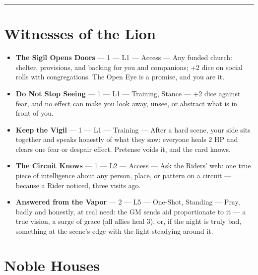 \medskip\hrule\medskip

\section{Witnesses of the Lion}

\begin{itemize}
    \item \textbf{The Sigil Opens Doors} --- 1 --- L1 --- Access --- Any funded church: shelter, provisions, and backing for you and companions; +2 dice on social rolls with congregations. The Open Eye is a promise, and you are it.
    \item \textbf{Do Not Stop Seeing} --- 1 --- L1 --- Training, Stance --- +2 dice against fear, and no effect can make you look away, unsee, or abstract what is in front of you.
    \item \textbf{Keep the Vigil} --- 1 --- L1 --- Training --- After a hard scene, your side sits together and speaks honestly of what they saw: everyone heals 2 HP and clears one fear or despair effect. Pretense voids it, and the card knows.
    \item \textbf{The Circuit Knows} --- 1 --- L2 --- Access --- Ask the Riders' web: one true piece of intelligence about any person, place, or pattern on a circuit --- because a Rider noticed, three visits ago.
    \item \textbf{Answered from the Vapor} --- 2 --- L5 --- One-Shot, Standing --- Pray, badly and honestly, at real need: the GM sends aid proportionate to it --- a true vision, a surge of grace (all allies heal 3), or, if the night is truly bad, something at the scene's edge with the light steadying around it.
\end{itemize}

\section{Noble Houses}

